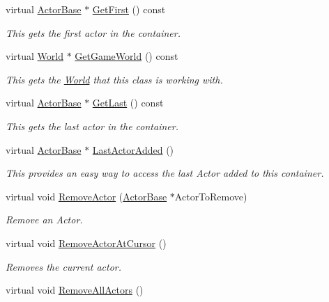 \begin{DoxyCompactItemize}
virtual \hyperlink{classMezzanine_1_1ActorBase}{ActorBase} $\ast$ \hyperlink{classMezzanine_1_1ActorContainerVector_ab39133337c950be6207e0ba46f151af9}{GetFirst} () const 
\begin{DoxyCompactList}\small\item\em This gets the first actor in the container. \item\end{DoxyCompactList}\item 
virtual \hyperlink{classMezzanine_1_1World}{World} $\ast$ \hyperlink{classMezzanine_1_1ActorContainerVector_afa1152c7bd84d8eba51bc4abe0500e51}{GetGameWorld} () const 
\begin{DoxyCompactList}\small\item\em This gets the \hyperlink{classMezzanine_1_1World}{World} that this class is working with. \item\end{DoxyCompactList}\item 
virtual \hyperlink{classMezzanine_1_1ActorBase}{ActorBase} $\ast$ \hyperlink{classMezzanine_1_1ActorContainerVector_a1b42e0385132ded405dd1f9558216938}{GetLast} () const 
\begin{DoxyCompactList}\small\item\em This gets the last actor in the container. \item\end{DoxyCompactList}\item 
virtual \hyperlink{classMezzanine_1_1ActorBase}{ActorBase} $\ast$ \hyperlink{classMezzanine_1_1ActorContainerVector_aaa354835e75bd28fb2fe7e51a8e73ca6}{LastActorAdded} ()
\begin{DoxyCompactList}\small\item\em This provides an easy way to access the last Actor added to this container. \item\end{DoxyCompactList}\item 
virtual void \hyperlink{classMezzanine_1_1ActorContainerVector_ab0f76ee775a4e92a55835e07edac0bce}{RemoveActor} (\hyperlink{classMezzanine_1_1ActorBase}{ActorBase} $\ast$ActorToRemove)
\begin{DoxyCompactList}\small\item\em Remove an Actor. \item\end{DoxyCompactList}\item 
virtual void \hyperlink{classMezzanine_1_1ActorContainerVector_a380140962919b31d8c2b23be6f69fbb0}{RemoveActorAtCursor} ()
\begin{DoxyCompactList}\small\item\em Removes the current actor. \item\end{DoxyCompactList}\item 
\hypertarget{classMezzanine_1_1ActorContainerVector_ae34237a2ba5649f00c45e87b8d570097}{
virtual void \hyperlink{classMezzanine_1_1ActorContainerVector_ae34237a2ba5649f00c45e87b8d570097}{RemoveAllActors} ()}
\label{classMezzanine_1_1ActorContainerVector_ae34237a2ba5649f00c45e87b8d570097}


\end{DoxyCompactItemize}
